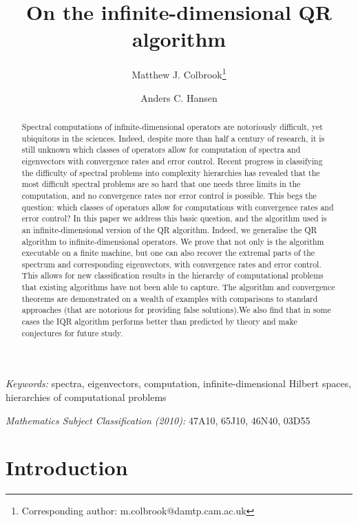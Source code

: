 \documentclass[a4paper,10pt]{article}
\title{
On the infinite-dimensional QR algorithm}
\author[$\dagger$]{Matthew J. Colbrook\footnote{Corresponding author: m.colbrook@damtp.cam.ac.uk}}
\author[$\dagger$]{Anders C. Hansen}
\affil[$\dagger$]{DAMTP, Centre for Mathematical Sciences, University of Cambridge, Wilberforce Rd, Cambridge CB3 0WA, United Kingdom}
\begin{document}
\date{}
\maketitle




\begin{abstract}
Spectral computations of infinite-dimensional operators are notoriously difficult, yet ubiquitous in the sciences. Indeed, despite more than half a century of research, it is still unknown which classes of operators allow for computation of spectra and eigenvectors with convergence rates and error control. Recent progress in classifying the difficulty of spectral problems into complexity hierarchies has revealed that the most difficult spectral problems are so hard that one needs three limits in the computation, and no convergence rates nor error control is possible. This begs the question: which classes of operators allow for computations with convergence rates and error control? In this paper we address this basic question, and the algorithm used is an infinite-dimensional version of the QR algorithm. Indeed, we generalise the QR algorithm to infinite-dimensional operators. We prove that not only is the algorithm executable on a finite machine, but one can also recover the extremal parts of the spectrum and corresponding eigenvectors, with convergence rates and error control. This allows for new classification results in the hierarchy of computational problems that existing algorithms have not been able to capture. The algorithm and convergence theorems are demonstrated on a wealth of examples with comparisons to standard approaches (that are notorious for providing false solutions).We also find that in some cases the IQR algorithm performs better than predicted by theory and make conjectures for future study. 
\end{abstract}

\vspace{1pc}
\noindent
{\it Keywords:} spectra, eigenvectors, computation, infinite-dimensional Hilbert spaces, hierarchies of computational problems

\vspace{0.5pc} \noindent
{\it Mathematics Subject Classification (2010):} 	47A10, 65J10, 46N40, 03D55





\section{Introduction}\label{intro}
\end{document}
